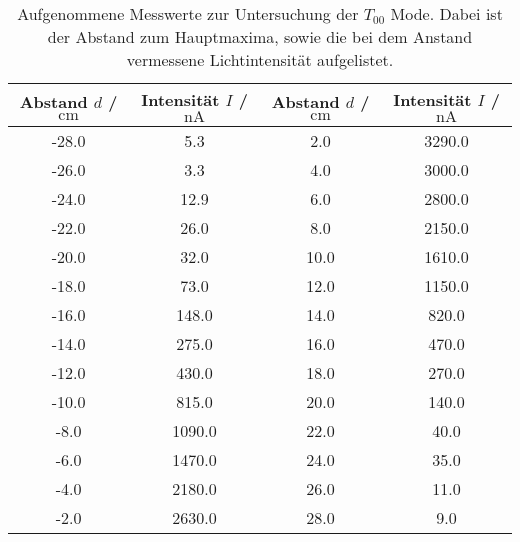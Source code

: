 \begin{table}
\centering
\caption{Aufgenommene Messwerte zur Untersuchung der $T_{00}$ Mode. Dabei ist der
Abstand zum Hauptmaxima, sowie die bei dem Anstand vermessene Lichtintensität aufgelistet.}
\begin{tabular}{cccc}
\toprule
Abstand $d$ / $\si{\centi\meter}$ & Intensität $I$ / $\si{\nano\ampere}$  & Abstand $d$ / $\si{\centi\meter}$ & Intensität $I$ / $\si{\nano\ampere}$ \\
\midrule
-28.0 & 5.3 & 2.0 & 3290.0 \\
-26.0 & 3.3 & 4.0 & 3000.0 \\
-24.0 & 12.9 & 6.0 & 2800.0 \\
-22.0 & 26.0 & 8.0 & 2150.0 \\
-20.0 & 32.0 & 10.0 & 1610.0 \\
-18.0 & 73.0 & 12.0 & 1150.0 \\
-16.0 & 148.0 & 14.0 & 820.0 \\
-14.0 & 275.0 & 16.0 & 470.0 \\
-12.0 & 430.0 & 18.0 & 270.0 \\
-10.0 & 815.0 & 20.0 & 140.0 \\
-8.0 & 1090.0 & 22.0 & 40.0 \\
-6.0 & 1470.0 & 24.0 & 35.0 \\
-4.0 & 2180.0 & 26.0 & 11.0 \\
-2.0 & 2630.0 & 28.0 & 9.0 \\
\bottomrule
\end{tabular}
\label{tab:t00}
\end{table}
